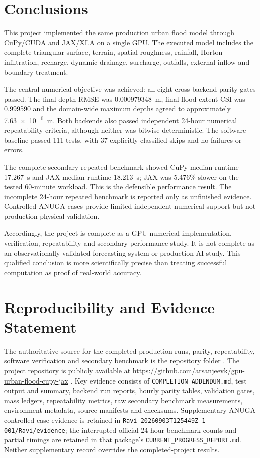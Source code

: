 \documentclass[11pt,a4paper,oneside]{report}
\begin{document}
\chapter{Conclusions}\label{chap:conclusion}
This project implemented the same production urban flood model through CuPy/CUDA and
JAX/XLA on a single GPU. The executed model includes the complete triangular surface,
terrain, spatial roughness, rainfall, Horton infiltration, recharge, dynamic drainage,
surcharge, outfalls, external inflow and boundary treatment.

The central numerical objective was achieved: all eight cross-backend parity gates passed.
The final depth RMSE was \SI{0.000979348}{\metre}, final flood-extent CSI was 0.999590 and
the domain-wide maximum depths agreed to approximately \SI{7.63e-6}{\metre}. Both backends
also passed independent 24-hour numerical repeatability criteria, although neither was
bitwise deterministic. The software baseline passed 111 tests, with 37 explicitly classified
skips and no failures or errors.

The complete secondary repeated benchmark showed CuPy median runtime
\SI{17.267}{\second} and JAX median runtime \SI{18.213}{\second}; JAX was 5.476\% slower on
the tested 60-minute workload. This is the defensible performance result. The incomplete
24-hour repeated benchmark is reported only as unfinished evidence. Controlled ANUGA cases
provide limited independent numerical support but not production physical validation.

Accordingly, the project is complete as a GPU numerical implementation, verification,
repeatability and secondary performance study. It is not complete as an observationally
validated forecasting system or production AI study. This qualified conclusion is more
scientifically precise than treating successful computation as proof of real-world accuracy.

\chapter*{Reproducibility and Evidence Statement}
The authoritative source for the completed production runs, parity, repeatability, software
verification and secondary benchmark is the repository folder
. The project repository is publicly available at
\url{https://github.com/arsanjeevk/gpu-urban-flood-cupy-jax} \cite{projectrepo}.
Key evidence consists of \texttt{COMPLETION\_ADDENDUM.md}, test output and summary,
backend run reports, hourly parity tables, validation gates, mass ledgers, repeatability
metrics, raw secondary benchmark measurements, environment metadata, source manifests and
checksums. Supplementary ANUGA controlled-case evidence is retained in
\texttt{Ravi-20260903T125449Z-1-001/Ravi/evidence}; the interrupted official 24-hour benchmark
counts and partial timings are retained in that package's \texttt{CURRENT\_PROGRESS\_REPORT.md}.
Neither supplementary record overrides the completed-project results.
\end{document}

